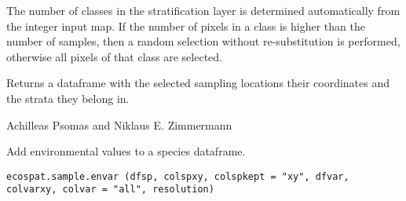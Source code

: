 \documentclass[a4paper]{book}
\begin{document}
%
\begin{Details}\relax
The number of classes in the stratification layer is determined automatically from the integer input map. 
If the number of pixels in a class is higher than the number of samples, 
then a random selection without re-substitution is performed, 
otherwise all pixels of that class are selected.
\end{Details}
%
\begin{Value}
Returns a dataframe with the selected sampling locations their coordinates and the strata they belong in.
\end{Value}
%
\begin{Author}\relax
Achilleas Psomas  and Niklaus E. Zimmermann 
\end{Author}
%
\begin{SeeAlso}\relax
{}
\end{SeeAlso}
%
\begin{Examples}
\end{Examples}
%
\begin{Description}\relax
Add environmental values to a species dataframe.
\end{Description}
%
\begin{Usage}
\begin{verbatim}
ecospat.sample.envar (dfsp, colspxy, colspkept = "xy", dfvar, 
colvarxy, colvar = "all", resolution)
\end{verbatim}
\end{Usage}
%
\end{document}
